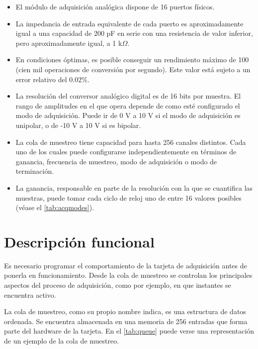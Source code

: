\begin{itemize}
	\item El módulo de adquisición analógica dispone de 16 puertos
		físicos.
	\item La impedancia de entrada equivalente de cada puerto es
		aproximadamente igual a una capacidad de 200 pF en serie
		con una resistencia de valor inferior, pero aproximadamente
		igual, a 1 k$\Omega$.
	\item En condiciones óptimas, es posible conseguir un rendimiento
		máximo de 100 \kms{} (cien mil operaciones de conversión
		por segundo). Este valor está sujeto a un error relativo
		del $0.02\%$.
	\item La resolución del conversor analógico digital es de 16 bits
		por muestra. El rango de amplitudes en el que opera depende
		de como esté configurado el modo de adquisición. Puede ir
		de 0 V a 10 V si el modo de adquisición es unipolar, o de
		-10 V a 10 V si es bipolar.
	\item La cola de muestreo tiene capacidad para hasta 256 canales
		distintos. Cada uno de los cuales puede configurarse
		independientemente en términos de ganancia, frecuencia de
		muestreo, modo de adquisición o modo de terminación.
	\item La ganancia, responsable en parte de la resolución con la que
		se cuantifica las muestras, puede tomar cada ciclo de reloj
		uno de entre 16 valores posibles (véase el
		\vref{tab:acqmodes}).
\end{itemize}


\section{Descripción funcional}\label{sec:funcdesc}

Es necesario programar el comportamiento de la tarjeta de adquisición antes
de ponerla en funcionamiento. Desde la cola de muestreo se controlan los
principales aspectos del proceso de adquisición, como por ejemplo, en que
instantes se encuentra activo.

La cola de muestreo, como su propio nombre indica, es una estructura de
datos ordenada. Se encuentra almacenada en una memoria  de 256
entradas que forma parte del hardware de la tarjeta. En el \cref{tab:queue}
puede verse una representación de un ejemplo de la cola de muestreo.

